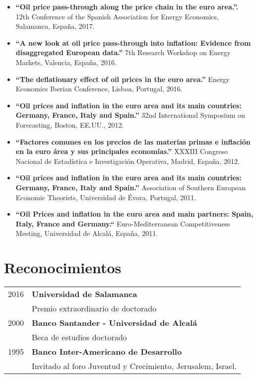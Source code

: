 \documentclass[11pt]{article}\usepackage[]{graphicx}\usepackage[]{color}
\begin{document}
\begin{itemize}

\item \textbf{``Oil price pass-through along the price chain in the euro area.''.} 12th Conference of the Spanish Association for Energy Economics, Salamanca, España, 2017.

\item \textbf{``A new look at oil price pass-through into inflation: Evidence from disaggregated European data.''} 7th Research Workshop on Energy Markets, Valencia, España, 2016.

\item \textbf{``The deflationary effect of oil prices in the euro area.''} Energy Economics Iberian Conference, Lisboa, Portugal, 2016.

\item \textbf{``Oil prices and inflation in the euro area and its main countries: Germany, France, Italy and Spain.''} 32nd International Symposium on Forecasting, Boston, EE.UU., 2012.

\item \textbf{``Factores comunes en los precios de las materias primas e inflación en la euro área y sus principales economías.''} XXXIII Congreso Nacional de Estadística e Investigación Operativa, Madrid, España, 2012.

\item \textbf{``Oil prices and inflation in the euro area and its main countries: Germany, France, Italy and Spain.''} Association of Southern European Economic Theorists, Universidad de Évora, Portugal, 2011.

\item \textbf{``Oil Prices and inflation in the euro area and main partners: Spain, Italy, France and Germany.``} Euro-Mediterranean Competitiveness Meeting, Universidad de Alcalá, España, 2011.

\end{itemize}


\section{Reconocimientos} 

\begin{tabular}{rl}

2016   & \textbf{Universidad de Salamanca}\\
& Premio extraordinario de doctorado\\

2000	 & \textbf{Banco Santander - Universidad de Alcalá}\\
&  Beca de estudios doctorado\\

1995 & \textbf{Banco Inter-Americano de Desarrollo}\\
& Invitado al foro Juventud y Crecimiento, Jerusalem, Israel.

\end{tabular}
\vspace{10pt}
\end{document}
